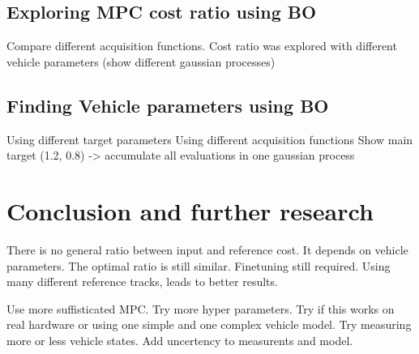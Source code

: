 \documentclass[twoside,twocolumn]{article}
\begin{document}
\subsection{Exploring MPC cost ratio using BO}
Compare different acquisition functions.
Cost ratio was explored with different vehicle parameters (show different gaussian processes)

\subsection{Finding Vehicle parameters using BO}
Using different target parameters
Using different acquisition functions
Show main target (1.2, 0.8) -> accumulate all evaluations in one gaussian process

\section{Conclusion and further research}
There is no general ratio between input and reference cost. It depends on vehicle parameters. The optimal ratio is still similar.
Finetuning still required. Using many different reference tracks, leads to better results.

Use more suffisticated MPC. Try more hyper parameters. Try if this works on real hardware or using one simple and one complex vehicle model. Try measuring more or less vehicle states. Add uncertency to measurents and model.



\end{document}

